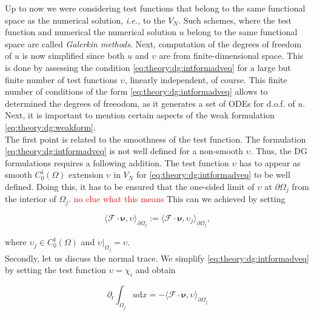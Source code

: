 Up to now we were considering test functions that belong to the same functional space as the numerical solution, \textit{i.e.,} to the $V_N$. Such schemes, where the test function and numerical the numerical solution $u$ belong to the same functional space are called \textit{Galerkin methods}. Next, computation of the degrees of freedom of $u$ is now simplified since both $u$ and $\upsilon$ are from finite-dimensional space. This is done by assessing the condition \ref{eq:theory:dg:intformadveq} for a large but finite number of test functions $\upsilon$, linearly independent, of course. This finite number of conditions of the form \ref{eq:theory:dg:intformadveq} allows to determined the degrees of freeodom, as it generates a set of ODEs for d.o.f. of $u$. \\

Next, it is important to mention certain aspects of the weak formulation \ref{eq:theory:dg:weakform}. \\

The first point is related to the smoothness of the test function. The formulation \ref{eq:theory:dg:intformadveq} is not well defined for a non-smooth $\upsilon$. Thus, the DG formulations requires a following addition. The test function $\upsilon$ has to appear as smooth $C_0 ^1(\Omega)$ extension $\upsilon$ in $V_N$ for \ref{eq:theory:dg:intformadveq} to be well defined. Doing this, it has to be ensured that the one-sided limit of $\upsilon$ at $\partial\Omega_j$ from the interior of $\Omega_j$. \textcolor{red}{no clue what this means} This can we achieved by setting

\begin{equation}
\langle\boldsymbol{\mathcal{F}}\cdot\boldsymbol{\nu},\upsilon\rangle_{\partial\Omega_j} := \langle\boldsymbol{\mathcal{F}}\cdot\boldsymbol{\nu},\upsilon_j\rangle_{\partial\Omega_j},
\end{equation}

where $\upsilon_j \in C_0 ^1 (\Omega)$ and $\upsilon|_{\Omega_j}=\upsilon$. \\

Secondly, let us discuss the normal trace. We simplify \ref{eq:theory:dg:intformadveq} by setting the test function $\upsilon = \chi_i$ and obtain

\begin{equation}
\partial_t\int_{\Omega_j}u\text{d}x = - \langle\boldsymbol{\mathcal{F}}\cdot\boldsymbol{\nu},\upsilon\rangle_{\partial\Omega_j}
\end{equation}


